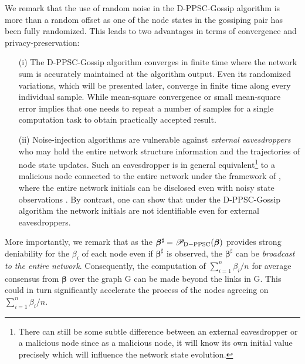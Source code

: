 \documentclass[a4paper, 11pt]{article}
\newcommand{\1}{\mathbf{1}}
\newcommand{\mG}{\mathrm{G}}
\newcommand{\betab}{\bm{\beta}}
\begin{document}
We remark that the use of random noise in the D-PPSC-Gossip algorithm is more than a random offset as one of the node states in the gossiping pair has been fully randomized. This leads to two advantages in terms of convergence and privacy-preservation:
\begin{itemize}
	\item[(i)] The D-PPSC-Gossip algorithm   converges in finite time where the network sum is accurately maintained at the algorithm output. Even its randomized  variations, which will be presented later, converge in finite time along every individual  sample. While mean-square convergence \cite{mo2017privacy} or small mean-square error \cite{huang2012differentially} implies that one needs to repeat a number of samples for a single  computation task to obtain practically accepted result.
	
	\item[(ii)] Noise-injection algorithms are vulnerable against {\it external eavesdroppers} who may hold the entire network structure information and the trajectories of node state updates. Such an eavesdropper is in general equivalent\footnote{There can still be some subtle difference between an external eavesdropper or a malicious node since as a malicious node, it will know its own initial value precisely which will influence the network state evolution.} to a malicious node connected to the entire network under the framework of   \cite{manitara2013privacy,mo2017privacy}, where   the entire network initials can be disclosed even with noisy state observations \cite{mo2017privacy}. By contrast, one can show that  under the D-PPSC-Gossip algorithm the network initials are not identifiable even for external eavesdroppers.
	
	
\end{itemize}
More importantly, we remark that as the $\betab^\sharp=\mathscr{P}_{\rm D-PPSC}(\betab)$ provides strong deniability for the $\beta_i$ of each node even if $\betab^\sharp$ is observed, the $\betab^\sharp$ can be {\em broadcast to the entire network}. Consequently, the computation of $\sum\limits_{i=1}^n\beta_i/n$ for average consensus from $\betab$ over the graph $\mG$ can be made beyond the links in $\mG$. This could in turn significantly accelerate the process of the nodes agreeing on $\sum\limits_{i=1}^n\beta_i/n$.
\end{document}
